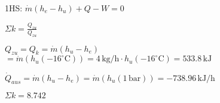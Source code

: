 1HS: \( \dot{m}(h_e - h_u) + Q - W = 0 \)  

\( \Sigma k = \frac{Q_{zu}}{Q_{zu}} \)  

\( Q_{zu} = Q_k = \dot{m}(h_u - h_e) \)  
\( = \dot{m}(h_u(-16^\circ \text{C})) = 4 \, \text{kg/h} \cdot h_u(-16^\circ \text{C}) = 533.8 \, \text{kJ} \)  

\( \dot{Q}_{aus} = \dot{m}(h_u - h_e) = \dot{m}(h_u(1 \, \text{bar})) = -738.96 \, \text{kJ/h} \)  

\( \Sigma k = 8.742 \)
